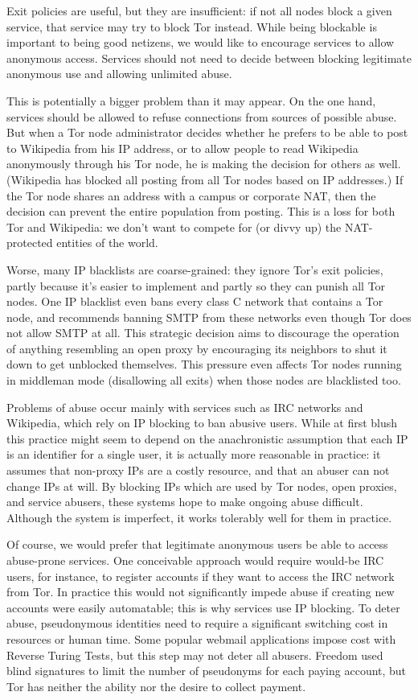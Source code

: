 \documentclass{llncs}
\begin{document}
Exit policies are useful, but they are insufficient: if not all nodes
block a given service, that service may try to block Tor instead.
While being blockable is important to being good netizens, we would like
to encourage services to allow anonymous access. Services should not
need to decide between blocking legitimate anonymous use and allowing
unlimited abuse.

This is potentially a bigger problem than it may appear.
On the one hand, services should be allowed to refuse connections from
sources of possible abuse.
But when a Tor node administrator decides whether he prefers to be able
to post to Wikipedia from his IP address, or to allow people to read
Wikipedia anonymously through his Tor node, he is making the decision
for others as well. (Wikipedia
has blocked all posting from all Tor nodes based on IP addresses.) If
the Tor node shares an address with a campus or corporate NAT,
then the decision can prevent the entire population from posting.
This is a loss for both Tor
and Wikipedia: we don't want to compete for (or divvy up) the
NAT-protected entities of the world.

Worse, many IP blacklists are coarse-grained: they ignore Tor's exit
policies, partly because it's easier to implement and partly
so they can punish
all Tor nodes. One IP blacklist even bans
every class C network that contains a Tor node, and recommends banning SMTP
from these networks even though Tor does not allow SMTP at all.  This
strategic decision aims to discourage the
operation of anything resembling an open proxy by encouraging its neighbors
to shut it down to get unblocked themselves. This pressure even
affects Tor nodes running in middleman mode (disallowing all exits) when
those nodes are blacklisted too.

Problems of abuse occur mainly with services such as IRC networks and
Wikipedia, which rely on IP blocking to ban abusive users.  While at first
blush this practice might seem to depend on the anachronistic assumption that
each IP is an identifier for a single user, it is actually more reasonable in
practice: it assumes that non-proxy IPs are a costly resource, and that an
abuser can not change IPs at will.  By blocking IPs which are used by Tor
nodes, open proxies, and service abusers, these systems hope to make
ongoing abuse difficult.  Although the system is imperfect, it works
tolerably well for them in practice.

Of course, we would prefer that legitimate anonymous users be able to
access abuse-prone services.  One conceivable approach would require
would-be IRC users, for instance, to register accounts if they want to
access the IRC network from Tor.  In practice this would not
significantly impede abuse if creating new accounts were easily automatable;
this is why services use IP blocking.  To deter abuse, pseudonymous
identities need to require a significant switching cost in resources or human
time.  Some popular webmail applications
impose cost with Reverse Turing Tests, but this step may not deter all
abusers.  Freedom used blind signatures to limit
the number of pseudonyms for each paying account, but Tor has neither the
ability nor the desire to collect payment.
\end{document}
